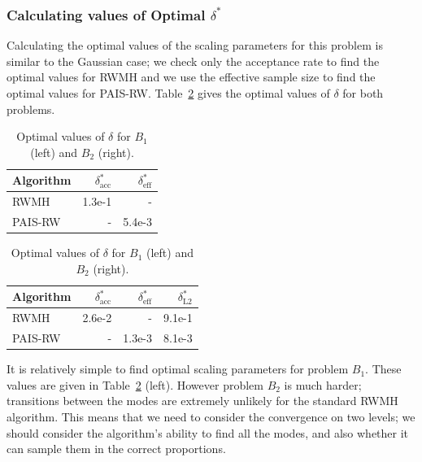 \documentclass[final]{siamltex}
\begin{document}
\subsubsection{Calculating values of Optimal $\delta^*$}\label{sec:BM1_opt_delta}

Calculating the optimal values of the scaling parameters for this problem is similar to the Gaussian case; we check only the acceptance rate to find the optimal values for RWMH and we use the effective sample size to find the optimal values for PAIS-RW. Table~\ref{table:BM_opt_delta} gives the optimal values of $\delta$ for both problems.

\begin{table}[!htb]
    \begin{minipage}{.5\linewidth}
      \centering
        \begin{tabular}{|l|r|r|}
	\hline
	Algorithm							& $\delta^*_{\text{acc}}$	& $\delta^*_{\text{eff}}$ \\ \hline
	RWMH								& 1.3e-1					& - \\
	PAIS-RW								& -						& 5.4e-3\\
	\hline
	\end{tabular}
    \end{minipage}%
    \begin{minipage}{.5\linewidth}
      \centering
        \begin{tabular}{|l|r|r|r|}
	\hline
	Algorithm							& $\delta^*_{\text{acc}}$	& $\delta^*_{\text{eff}}$	& $\delta^*_{\text{L2}}$ \\ \hline
	RWMH								& 2.6e-2					& - 						& 9.1e-1\\
	PAIS-RW								& -						& 1.3e-3 					& 8.1e-3\\
	\hline
	\end{tabular}
    \end{minipage}
	\vspace{1mm}
	\caption{Optimal values of $\delta$ for $B_1$ (left) and $B_2$ (right).}
	\label{table:BM_opt_delta}
\end{table}

It is relatively simple to find optimal scaling parameters for problem $B_1$. These values are given in Table~\ref{table:BM_opt_delta} (left). However problem $B_2$ is much harder; transitions between the modes are extremely unlikely for the standard RWMH algorithm. This means that we need to consider the
convergence on two levels; we should consider the algorithm's ability
to find all the modes, and also whether it can sample them in the correct proportions.
\end{document}
